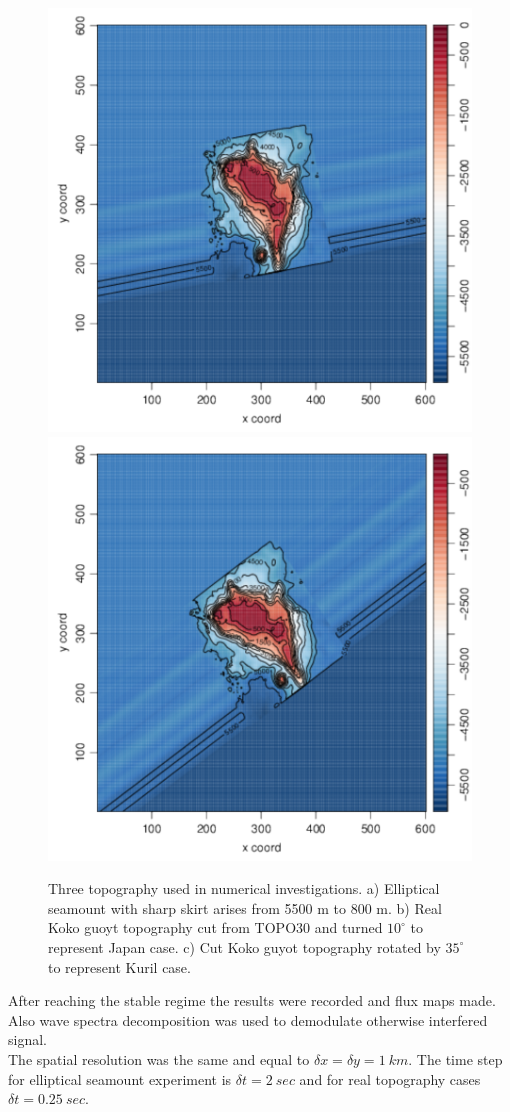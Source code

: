 \begin{figure}[h]
\includegraphics[scale=0.35]{../figures/japan_bathy.pdf}
\includegraphics[scale=0.35]{../figures/kuril_bathy.pdf}
\caption{Three topography used in numerical investigations. a) Elliptical seamount with sharp skirt arises from 5500 m to 800 m. b) Real Koko guoyt topography cut from TOPO30 and turned $10^{\circ}$ to represent Japan case. c) Cut Koko guyot topography rotated by $35^{\circ}$ to represent Kuril case.}
\end{figure}
After reaching the stable regime the results were recorded and flux maps made. Also wave spectra decomposition was used to demodulate otherwise interfered signal.\\
The spatial resolution was the same and equal to $\delta x = \delta y = 1~km$. The time step for elliptical seamount experiment is $\delta t = 2~sec$ and for real topography cases $\delta t = 0.25~sec$.

